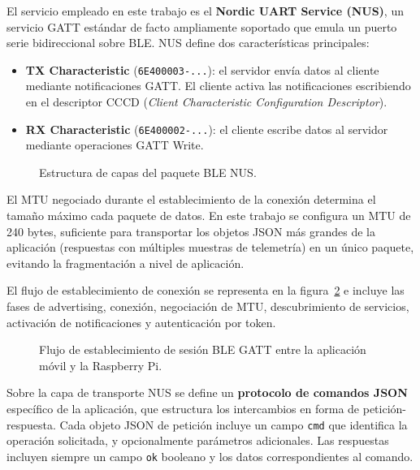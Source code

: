 El servicio empleado en este trabajo es el \textbf{Nordic UART Service (NUS)}, un servicio GATT estándar de facto ampliamente soportado que emula un puerto serie bidireccional sobre BLE. NUS define dos características principales:

\begin{itemize}
    \item \textbf{TX Characteristic} (\texttt{6E400003-...}): el servidor envía datos al cliente mediante notificaciones GATT. El cliente activa las notificaciones escribiendo en el descriptor CCCD (\textit{Client Characteristic Configuration Descriptor}).
    \item \textbf{RX Characteristic} (\texttt{6E400002-...}): el cliente escribe datos al servidor mediante operaciones GATT Write.
\end{itemize}

\begin{figure}[!htbp]
\centering
\caption{Estructura de capas del paquete BLE NUS.}
\label{fig:ble_nus_packet}
\end{figure}

El MTU negociado durante el establecimiento de la conexión determina el tamaño máximo  cada paquete de datos. En este trabajo se configura un MTU de 240 bytes, suficiente
para transportar los objetos JSON más grandes de la aplicación (respuestas con múltiples muestras de telemetría) en un único paquete, evitando la fragmentación a nivel de aplicación.

El flujo de establecimiento de conexión se representa en la figura~\ref{fig:ble_gatt_flow} e incluye las fases de advertising, conexión, negociación de MTU, descubrimiento de servicios, activación de notificaciones y autenticación por token.

\begin{figure}[!htbp]
\centering
\caption{Flujo de establecimiento de sesión BLE GATT entre la aplicación móvil y la Raspberry Pi.}
\label{fig:ble_gatt_flow}
\end{figure}

Sobre la capa de transporte NUS se define un \textbf{protocolo de comandos JSON} específico de la aplicación, que estructura los intercambios en forma de petición-respuesta. Cada objeto JSON de petición incluye un campo \texttt{cmd} que identifica la operación solicitada, y opcionalmente parámetros adicionales. Las respuestas incluyen siempre un campo \texttt{ok} booleano y los datos correspondientes al comando.
